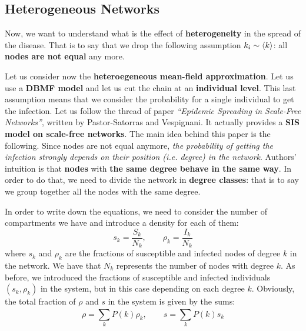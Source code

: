 \documentclass[../main/main.tex]{subfiles}
\begin{document}


\subsection{Heterogeneous Networks}

Now, we want to understand what is the effect of \textbf{heterogeneity} in the spread of the disease. That is to say that we drop the following assumption \( k_i \sim \expval{k}  \): all \textbf{nodes are not equal} any more.

Let us consider now the \textbf{heteroegeneous mean-field approximation}. Let us use a \textbf{DBMF model} and let us cut the chain at an \textbf{individual level}. This last assumption means that we consider the probability for a single individual to get the infection.
Let us follow the thread of paper \textit{“Epidemic Spreading in Scale-Free Networks”}, written by Pastor-Satorras and Vespignani. It actually provides a \textbf{SIS model on scale-free networks}. The main idea behind this paper is the following. Since nodes are not equal anymore, \textit{the probability of getting the infection strongly depends on their position (i.e. degree) in the network}. Authors' intuition is that \textbf{nodes} with \textbf{the same degree behave in the same way}. In order to do that, we need to divide the network in \textbf{degree classes}: that is to say we group together all the nodes with the same degree.


In order to write down the equations, we need to consider the number of compartments we have and introduce a density for each of them:
\begin{equation*}
  s_k = \frac{S_k}{N_k}, \qquad \rho _k = \frac{I_k}{N_k}
\end{equation*}
where \( s_k \) and \( \rho _k \) are the fractions of susceptible and infected nodes of degree \( k \) in the network. We have that \( N_k \) represents the number of nodes with degree \( k \). As before, we introduced the fractions of susceptible and infected individuals $(s_k, \rho_k)$ in the system, but in this case depending on each degree \( k \).
Obviously, the total fraction of \( \rho  \) and \( s \) in the system is given by the sums:
\begin{equation}
  \rho = \sum_{k}^{} P(k) \rho _k, \qquad s = \sum_{k}^{} P(k) s_k
\end{equation}
\end{document}
